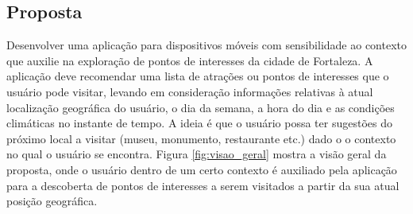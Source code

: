 \documentclass[10pt,a4paper,twocolumn]{article}
\begin{document}
\subsection{Proposta}
Desenvolver uma aplicação para dispositivos móveis com sensibilidade ao contexto que auxilie na exploração de pontos de interesses da cidade de Fortaleza. A aplicação deve recomendar uma lista de atrações ou pontos de interesses que o usuário pode visitar, levando em consideração informações relativas à atual localização geográfica do usuário, o dia da semana, a hora do dia e as condições climáticas no instante de tempo. A ideia é que o usuário possa ter sugestões do próximo local a visitar (museu, monumento, restaurante etc.) dado o o contexto no qual o usuário se encontra. Figura \ref{fig:visao_geral} mostra a visão geral da proposta, onde o usuário dentro de um certo contexto é auxiliado pela aplicação para a descoberta de pontos de interesses a serem visitados a partir da sua atual posição geográfica.
\end{document}
